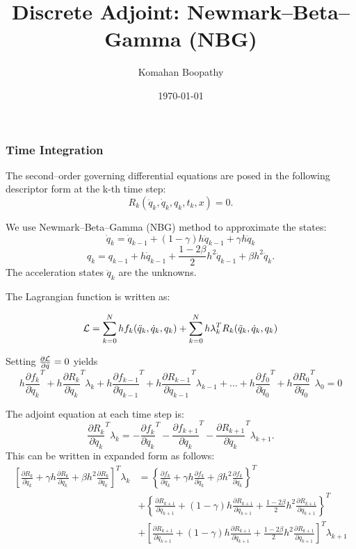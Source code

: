 \documentclass{beamer}
\title[\hspace{-0.2cm} DIRK Adjoint]
{
Discrete Adjoint: Newmark--Beta--Gamma (NBG)
}
\author[Komahan Boopathy]
{
  \Large {Komahan Boopathy}\\
}
\institute
{
  \large Georgia Institute of Technology\\
 School of Aerospace Engineering\\
 Atlanta, GA
}
\date
{
\small \today
}
\newcommand{\pd}[2]{\frac{\partial #1}{\partial #2}}
\begin{document}
\begin{frame}
  \titlepage
\end{frame}


\begin{frame}[allowframebreaks] \frametitle{Time Integration}

  The second--order governing differential equations are posed in the following
  descriptor form at the k-th time step:
  $$ R_k(\ddot{q}_k, \dot{q}_k, q_k, t_k , x) = 0.$$

  We use Newmark--Beta--Gamma (NBG) method to approximate the states:
  $$ \dot{q}_k  = \dot{q}_{k-1}  + (1-\gamma) h \ddot{q}_{k-1} +  \gamma h \ddot{q}_{k}$$ 
  $$ {q}_k      =     {q}_{k-1}  + h \dot{q}_{k-1} +\frac{1-2\beta}{2} h^2\ddot{q}_{k-1}+ \beta h^2 \ddot{q}_k.$$
  The acceleration states $\ddot{q}_k$ are the unknowns.
  
  \framebreak

  The Lagrangian function is written as:

  $${\cal{L}} = \sum_{k=0}^N h f_k(\ddot{q}_k, \dot{q}_k, q_k) + \sum_{k=0}^N h  \lambda_k^T R_k(\ddot{q}_k, \dot{q}_k, q_k) $$

  Setting $\pd{\cal{L}}{\ddot{q}} = 0$ yields
  \small{
  $$ h\pd{f_k}{\ddot{q}_k}^T + h \pd{R_k}{\ddot{q}_k}^T \lambda_k
  + h\pd{f_{k-1}}{\ddot{q}_{k-1}}^T +  h \pd{R_{k-1}}{\ddot{q}_{k-1}}^T \lambda_{k-1} + \ldots + 
  h\pd{f_0}{\ddot{q}_0}^T + h \pd{R_0}{\ddot{q}_0}^T \lambda_0
  = 0 $$
  }

  The adjoint equation at each time step is:
  $$\pd{R_k}{\ddot{q}_k}^T \lambda_k = - \pd{f_k}{\ddot{q}_k}^T  - \pd{f_{k+1}}{\ddot{q}_{k}}^T - \pd{R_{k+1}}{\ddot{q}_{k}}^T \lambda_{k+1}.$$
  This can be written in expanded form as follows:
  \scriptsize{
  \begin{equation}\nonumber\begin{split}
    \left[ \pd{R_k}{\ddot{q}_k} + \gamma h \pd{R_k}{\dot{q}_k} + \beta h^2 \pd{R_k}{{q}_k} \right]^T \lambda_k & = \left\{ \pd{f_k}{\ddot{q}_k} + \gamma h \pd{f_k}{\dot{q}_k} + \beta h^2 \pd{f_k}{{q}_k} \right\}^T \\ & +  \left\{ \pd{R_{k+1}}{\ddot{q}_{k+1}} + (1-\gamma) h \pd{R_{k+1}}{\dot{q}_{k+1}} + \frac{1-2\beta}{2} h^2 \pd{R_{k+1}}{{q}_{k+1}} \right\}^T \\
    & +  \left[ \pd{R_{k+1}}{\ddot{q}_{k+1}} + (1-\gamma) h \pd{R_{k+1}}{\dot{q}_{k+1}} + \frac{1-2\beta}{2} h^2 \pd{R_{k+1}}{{q}_{k+1}} \right]^T\lambda_{k+1} \\
      \end{split}
  \end{equation}
  }
  
\end{frame}
\end{document}

